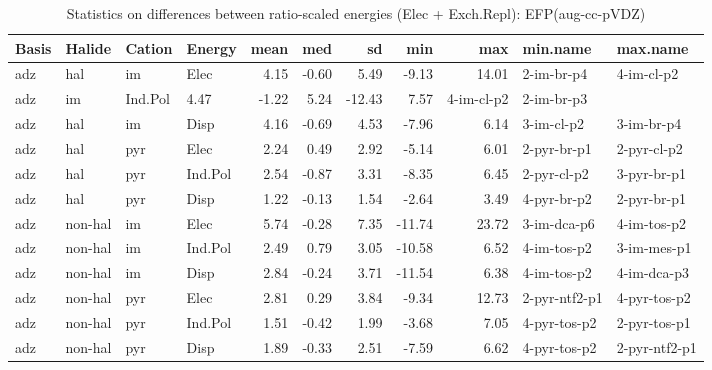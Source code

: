 \documentclass[a4paper]{article}
\begin{document}
\begin{table}[ht]
\centering
\begin{tabular}{llllrrrrrll}
  \hline
Basis & Halide & Cation & Energy & mean & med & sd & min & max & min.name & max.name \\ 
  \hline
adz & hal & im & Elec & 4.15 & -0.60 & 5.49 & -9.13 & 14.01 & 2-im-br-p4 & 4-im-cl-p2 \\ 
  adz & im & Ind.Pol & 4.47 & -1.22 & 5.24 & -12.43 & 7.57 & 4-im-cl-p2 & 2-im-br-p3 \\ 
  adz & hal & im & Disp & 4.16 & -0.69 & 4.53 & -7.96 & 6.14 & 3-im-cl-p2 & 3-im-br-p4 \\ 
  adz & hal & pyr & Elec & 2.24 & 0.49 & 2.92 & -5.14 & 6.01 & 2-pyr-br-p1 & 2-pyr-cl-p2 \\ 
  adz & hal & pyr & Ind.Pol & 2.54 & -0.87 & 3.31 & -8.35 & 6.45 & 2-pyr-cl-p2 & 3-pyr-br-p1 \\ 
  adz & hal & pyr & Disp & 1.22 & -0.13 & 1.54 & -2.64 & 3.49 & 4-pyr-br-p2 & 2-pyr-br-p1 \\ 
  adz & non-hal & im & Elec & 5.74 & -0.28 & 7.35 & -11.74 & 23.72 & 3-im-dca-p6 & 4-im-tos-p2 \\ 
  adz & non-hal & im & Ind.Pol & 2.49 & 0.79 & 3.05 & -10.58 & 6.52 & 4-im-tos-p2 & 3-im-mes-p1 \\ 
  adz & non-hal & im & Disp & 2.84 & -0.24 & 3.71 & -11.54 & 6.38 & 4-im-tos-p2 & 4-im-dca-p3 \\ 
  adz & non-hal & pyr & Elec & 2.81 & 0.29 & 3.84 & -9.34 & 12.73 & 2-pyr-ntf2-p1 & 4-pyr-tos-p2 \\ 
  adz & non-hal & pyr & Ind.Pol & 1.51 & -0.42 & 1.99 & -3.68 & 7.05 & 4-pyr-tos-p2 & 2-pyr-tos-p1 \\ 
  adz & non-hal & pyr & Disp & 1.89 & -0.33 & 2.51 & -7.59 & 6.62 & 4-pyr-tos-p2 & 2-pyr-ntf2-p1 \\ 
   \hline
\end{tabular}
\caption{Statistics on differences between ratio-scaled energies (Elec + Exch.Repl): EFP(aug-cc-pVDZ)}
\end{table}
\end{document}
